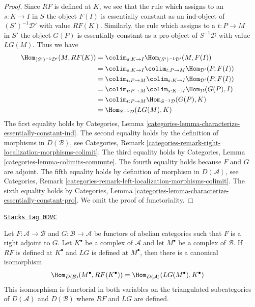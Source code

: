 \begin{proof}
Since $RF$ is defined at $K$, we see that the rule which assigns to an
$s : K \to I$ in $S$ the object $F(I)$ is essentially
constant as an ind-object of $(S')^{-1}\mathcal{D}'$ with value $RF(K)$.
Similarly, the rule which assigns to a $t : P \to M$ in $S'$
the object $G(P)$ is essentially constant as a pro-object of
$S^{-1}\mathcal{D}$ with value $LG(M)$. Thus we have
\begin{align*}
\Hom_{(S')^{-1}\mathcal{D}'}(M, RF(K))
& =
\colim_{s : K \to I} \Hom_{(S')^{-1}\mathcal{D}'}(M, F(I)) \\
& =
\colim_{s : K \to I} \colim_{t : P \to M} \Hom_{\mathcal{D}'}(P, F(I)) \\
& =
\colim_{t : P \to M} \colim_{s : K \to I} \Hom_{\mathcal{D}'}(P, F(I)) \\
& =
\colim_{t : P \to M} \colim_{s : K \to I} \Hom_{\mathcal{D}}(G(P), I) \\
& =
\colim_{t : P \to M} \Hom_{S^{-1}\mathcal{D}}(G(P), K) \\
& =
\Hom_{S^{-1}\mathcal{D}}(LG(M), K)
\end{align*}
The first equality holds by
Categories, Lemma \ref{categories-lemma-characterize-essentially-constant-ind}.
The second equality holds by the definition of morphisms in
$D(\mathcal{B})$, see Categories, Remark
\ref{categories-remark-right-localization-morphisms-colimit}.
The third equality holds by
Categories, Lemma \ref{categories-lemma-colimits-commute}.
The fourth equality holds because $F$ and $G$ are adjoint.
The fifth equality holds by definition of morphism
in $D(\mathcal{A})$, see Categories, Remark
\ref{categories-remark-left-localization-morphisms-colimit}.
The sixth equality holds by
Categories, Lemma \ref{categories-lemma-characterize-essentially-constant-pro}.
We omit the proof of functoriality.
\end{proof}

\begin{lemma}
\label{derived-lemma-pre-derived-adjoint-functors}
\href{https://stacks.math.columbia.edu/tag/0DVC}{\texttt{Stacks tag 0DVC}}

Let $F : \mathcal{A} \to \mathcal{B}$ and $G : \mathcal{B} \to \mathcal{A}$
be functors of abelian categories such that $F$ is a right adjoint to $G$.
Let $K^\bullet$ be a complex of $\mathcal{A}$ and let $M^\bullet$ be
a complex of $\mathcal{B}$. If $RF$ is defined at $K^\bullet$
and $LG$ is defined at $M^\bullet$, then there is a canonical isomorphism
$$
\Hom_{D(\mathcal{B})}(M^\bullet, RF(K^\bullet)) =
\Hom_{D(\mathcal{A})}(LG(M^\bullet), K^\bullet)
$$
This isomorphism is functorial in both variables on the triangulated
subcategories of $D(\mathcal{A})$ and $D(\mathcal{B})$
where $RF$ and $LG$ are defined.
\end{lemma}

